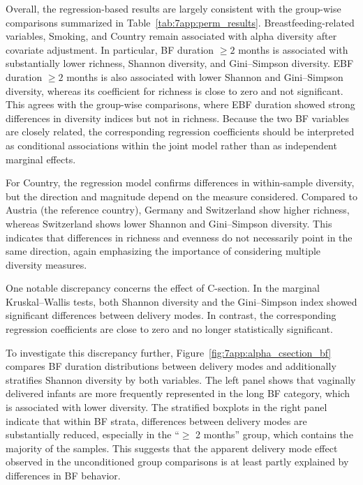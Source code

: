 Overall, the regression-based results are largely consistent with the group-wise comparisons summarized in Table~\ref{tab:7app:perm_results}. Breastfeeding-related variables, Smoking, and Country remain associated with alpha diversity after covariate adjustment. In particular, BF duration $\ge2$ months is associated with substantially lower richness, Shannon diversity, and Gini--Simpson diversity. EBF duration $\ge2$ months is also associated with lower Shannon and Gini--Simpson diversity, whereas its coefficient for richness is close to zero and not significant. This agrees with the group-wise comparisons, where EBF duration showed strong differences in diversity indices but not in richness. Because the two BF variables are closely related, the corresponding regression coefficients should be interpreted as conditional associations within the joint model rather than as independent marginal effects.

For Country, the regression model confirms differences in within-sample diversity, but the direction and magnitude depend on the measure considered. Compared to Austria (the reference country), Germany and Switzerland show higher richness, whereas Switzerland shows lower Shannon and Gini--Simpson diversity. This indicates that differences in richness and evenness do not necessarily point in the same direction, again emphasizing the importance of considering multiple diversity measures.

One notable discrepancy concerns the effect of C-section. In the marginal Kruskal--Wallis tests, both Shannon diversity and the Gini--Simpson index showed significant differences between delivery modes. In contrast, the corresponding regression coefficients are close to zero and no longer statistically significant.

To investigate this discrepancy further, Figure~\ref{fig:7app:alpha_csection_bf} compares BF duration distributions between delivery modes and additionally stratifies Shannon diversity by both variables. The left panel shows that vaginally delivered infants are more frequently represented in the long BF category, which is associated with lower diversity. The stratified boxplots in the right panel indicate that within BF strata, differences between delivery modes are substantially reduced, especially in the ``$\ge$ 2 months'' group, which contains the majority of the samples. This suggests that the apparent delivery mode effect observed in the unconditioned group comparisons is at least partly explained by differences in BF behavior.

